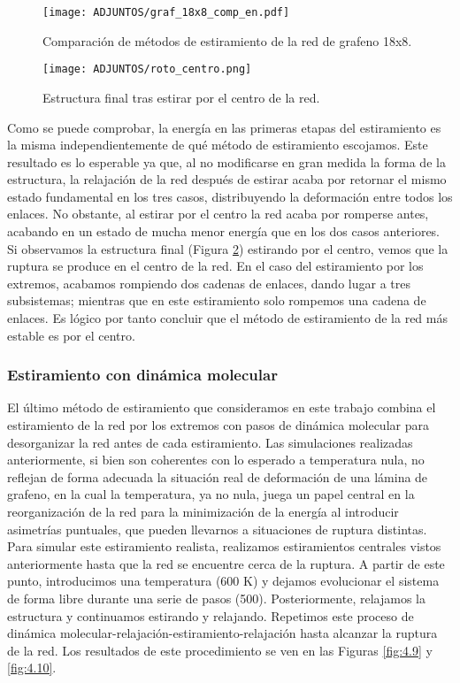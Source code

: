 \begin{figure}[!h]
    \centering
    \texttt{[image: ADJUNTOS/graf\_18x8\_comp\_en.pdf]}
    \caption{Comparación de métodos de estiramiento de la red de grafeno 18x8.}
    \label{fig:4.7}
\end{figure}

\begin{figure}[!h]
    \centering
    \texttt{[image: ADJUNTOS/roto\_centro.png]}
    \caption{Estructura final tras estirar por el centro de la red.}
    \label{fig:4.8}
\end{figure}

Como se puede comprobar, la energía en las primeras etapas del estiramiento es la misma independientemente de qué método de estiramiento escojamos. Este resultado es lo esperable ya que, al no modificarse en gran medida la forma de la estructura, la relajación de la red después de estirar acaba por retornar el mismo estado fundamental en los tres casos, distribuyendo la deformación entre todos los enlaces. No obstante, al estirar por el centro la red acaba por romperse antes, acabando en un estado de mucha menor energía que en los dos casos anteriores. Si observamos la estructura final (Figura \ref{fig:4.8}) estirando por el centro, vemos que la ruptura se produce en el centro de la red. En el caso del estiramiento por los extremos, acabamos rompiendo dos cadenas de enlaces, dando lugar a tres subsistemas; mientras que en este estiramiento solo rompemos una cadena de enlaces. Es lógico por tanto concluir que el método de estiramiento de la red más estable es por el centro.

\subsubsection{Estiramiento con dinámica molecular}

El último método de estiramiento que consideramos en este trabajo combina el estiramiento de la red por los extremos con pasos de dinámica molecular para desorganizar la red antes de cada estiramiento. Las simulaciones realizadas anteriormente, si bien son coherentes con lo esperado a temperatura nula, no reflejan de forma adecuada la situación real de deformación de una lámina de grafeno, en la cual la temperatura, ya no nula, juega un papel central en la reorganización de la red para la minimización de la energía al introducir asimetrías puntuales, que pueden llevarnos a situaciones de ruptura distintas. Para simular este estiramiento realista, realizamos estiramientos centrales vistos anteriormente hasta que la red se encuentre cerca de la ruptura. A partir de este punto, introducimos una temperatura (600 K) y dejamos evolucionar el sistema de forma libre durante una serie de pasos (500). Posteriormente, relajamos la estructura y continuamos estirando y relajando. Repetimos este proceso de dinámica molecular-relajación-estiramiento-relajación hasta alcanzar la ruptura de la red. Los resultados de este procedimiento se ven en las Figuras \ref{fig:4.9} y \ref{fig:4.10}. \\

